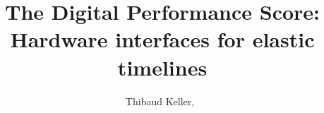\documentclass[journal,onecolumn]{IEEEtran}
\begin{document}
%
\title{The Digital Performance Score:\\
Hardware interfaces for elastic timelines}
%
%
%

\author{Thibaud Keller,~}

% 
%
\end{document}
